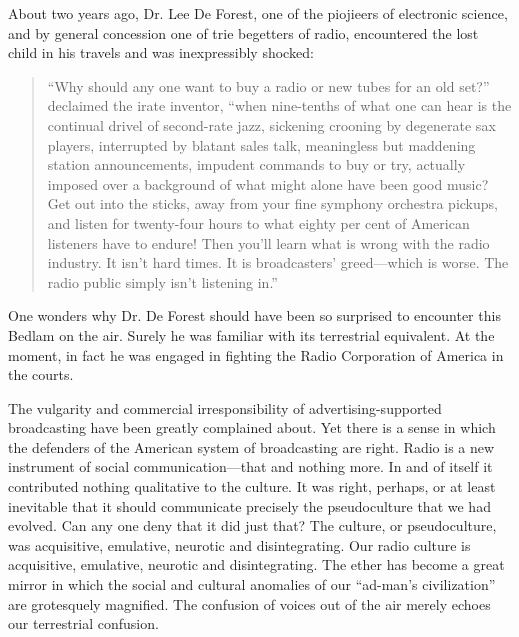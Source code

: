 About two years ago, Dr. Lee De Forest, one of the piojieers of
electronic science, and by general concession one of trie begetters of
radio, encountered the lost child in his travels and was inexpressibly
shocked:

\begin{quote}
``Why should any one want to buy a radio or new tubes for an old set?''
declaimed the irate inventor, ``when nine-tenths of what one can hear is
the continual drivel of second-rate jazz, sickening crooning by
degenerate sax players, interrupted by blatant sales talk, meaningless
but maddening station announcements, impudent commands to buy or try,
actually imposed over a background of what might alone have been good
music? Get out into the sticks, away from your fine symphony orchestra
pickups, and listen for twenty-four hours to what eighty per cent of
American listeners have to endure! Then you'll learn what is wrong with
the radio industry. It isn't hard times. It is broadcasters'
greed---which is worse. The radio public simply isn't listening in.''
\end{quote}

One wonders why Dr. De Forest should have been so surprised to encounter
this Bedlam on the air. Surely he was familiar with its terrestrial
equivalent. At the moment, in fact he was engaged in fighting the Radio
Corporation of America in the courts.

The vulgarity and commercial irresponsibility of advertising-supported
broadcasting have been greatly complained about. Yet there is a sense in
which the defenders of the American system of broadcasting are right.
Radio is a new instrument of social communication---that and nothing
more. In and of itself it contributed nothing qualitative to the
culture. It was right, perhaps, or at least inevitable that it should
communicate precisely the pseudoculture that we had evolved. Can any one
deny that it did just that? The culture, or pseudoculture, was
acquisitive, emulative, neurotic and disintegrating. Our radio culture
is acquisitive, emulative, neurotic and disintegrating. The ether has
become a great mirror in which the social and cultural anomalies of our
``ad-man's civilization'' are grotesquely magnified. The confusion of
voices out of the air merely echoes our terrestrial confusion.

